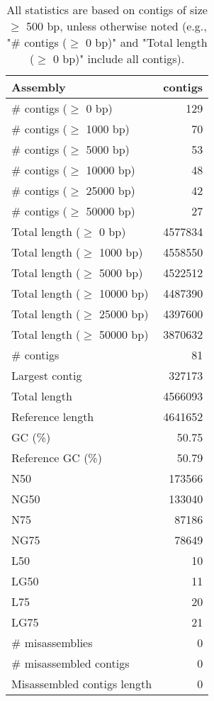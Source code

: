 \documentclass[12pt,a4paper]{article}
\begin{document}
\begin{table}[ht]
\begin{center}
\caption{All statistics are based on contigs of size $\geq$ 500 bp, unless otherwise noted (e.g., "\# contigs ($\geq$ 0 bp)" and "Total length ($\geq$ 0 bp)" include all contigs).}
\begin{tabular}{|l*{1}{|r}|}
\hline
Assembly & contigs \\ \hline
\# contigs ($\geq$ 0 bp) & 129 \\ \hline
\# contigs ($\geq$ 1000 bp) & 70 \\ \hline
\# contigs ($\geq$ 5000 bp) & 53 \\ \hline
\# contigs ($\geq$ 10000 bp) & 48 \\ \hline
\# contigs ($\geq$ 25000 bp) & 42 \\ \hline
\# contigs ($\geq$ 50000 bp) & 27 \\ \hline
Total length ($\geq$ 0 bp) & 4577834 \\ \hline
Total length ($\geq$ 1000 bp) & 4558550 \\ \hline
Total length ($\geq$ 5000 bp) & 4522512 \\ \hline
Total length ($\geq$ 10000 bp) & 4487390 \\ \hline
Total length ($\geq$ 25000 bp) & 4397600 \\ \hline
Total length ($\geq$ 50000 bp) & 3870632 \\ \hline
\# contigs & 81 \\ \hline
Largest contig & 327173 \\ \hline
Total length & 4566093 \\ \hline
Reference length & 4641652 \\ \hline
GC (\%) & 50.75 \\ \hline
Reference GC (\%) & 50.79 \\ \hline
N50 & 173566 \\ \hline
NG50 & 133040 \\ \hline
N75 & 87186 \\ \hline
NG75 & 78649 \\ \hline
L50 & 10 \\ \hline
LG50 & 11 \\ \hline
L75 & 20 \\ \hline
LG75 & 21 \\ \hline
\# misassemblies & 0 \\ \hline
\# misassembled contigs & 0 \\ \hline
Misassembled contigs length & 0 \\ \hline

\end{tabular}
\end{center}
\end{table}
\end{document}
